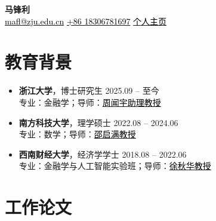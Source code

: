 \documentclass[11pt, a4paper]{article}
\begin{document}
\begin{center}
  {\LARGE\bfseries 马锋利}\\[6pt]
  \href{mailto:mafl@zju.edu.cn}{\textcolor{black}{mafl@zju.edu.cn}}\hspace{2.5em}
  \href{tel:+8618306781697}{\textcolor{black}{+86 18306781697}}\hspace{2.5em}
  \href{https://sharpma.github.io}{\textcolor{black}{个人主页}}
\end{center}

\section{教育背景}

\begin{itemize}[itemsep=5pt, topsep=5pt]
  \item \textbf{浙江大学}，博士研究生 \hfill 2025.09 -- 至今\\[4pt]
    专业：金融学；导师：\href{https://person.zju.edu.cn/wenyuzhou}{\textcolor{black}{周闻宇助理教授}}

  \item \textbf{南方科技大学}，理学硕士 \hfill 2022.08 -- 2024.06\\[4pt]
    专业：数学；导师：\href{https://faculty.sustech.edu.cn/shaoqm}{\textcolor{black}{邵启满教授}}

  \item \textbf{西南财经大学}，经济学学士 \hfill 2018.08 -- 2022.06\\[4pt]
    专业：金融学与人工智能实验班；导师：\href{https://jinrong.swufe.edu.cn/info/2039/23537.htm}{\textcolor{black}{徐秋华教授}}
\end{itemize}

\section{工作论文}
\end{document}
